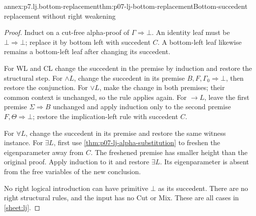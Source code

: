 \begin{annexitem}{annex:p7.lj.bottom-replacement}{thm:p07-lj-bottom-replacement}{Bottom-succedent replacement without right weakening}
\begin{proof}
Induct on a cut-free alpha-proof of \(\Gamma\Rightarrow\bot\).
An identity leaf must be \(\bot\Rightarrow\bot\); replace it by
bottom left with succedent \(C\).  A bottom-left leaf likewise remains
a bottom-left leaf after changing its succedent.

For WL and CL change the succedent in the premise by induction and
restore the structural step.  For \(\land L\), change the succedent
in its premise \(B,F,\Gamma_0\Rightarrow\bot\), then restore the
conjunction.  For \(\lor L\), make the change in both premises;
their common context is unchanged, so the rule applies again.  For
\(\to L\), leave the first premise \(\Sigma\Rightarrow B\)
unchanged and apply induction only to the second premise
\(F,\Theta\Rightarrow\bot\); restore the implication-left rule
with succedent \(C\).

For \(\forall L\), change the succedent in its premise and restore
the same witness instance.  For \(\exists L\), first use
\ref{thm:p07-lj-alpha-substitution} to freshen the eigenparameter away
from \(C\).  The freshened premise has smaller height than the original
proof.  Apply induction to it and restore \(\exists L\).  Its
eigenparameter is absent from the free variables of the new conclusion.

No right logical introduction can have primitive \(\bot\) as its
succedent.  There are no right structural rules, and the input has no
Cut or Mix.  These are all cases in \ref{sheet:lj}.
\end{proof}
\end{annexitem}

